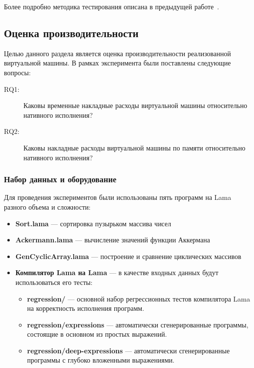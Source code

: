 Более подробно методика тестирования описана в предыдущей работе~\cite{ParfenovPractice2026}. 
\subsection{Оценка производительности}

Целью данного раздела является оценка производительности реализованной виртуальной машины. В рамках эксперимента были поставлены следующие вопросы:
\begin{description}
  \item[RQ1:] Каковы временные накладные расходы виртуальной машины относительно нативного исполнения?
  \item[RQ2:] Каковы накладные расходы виртуальной машины по памяти относительно нативного исполнения?
\end{description}

\subsubsection{Набор данных и оборудование}
Для проведения экспериментов были использованы пять программ на Lama разного объема и сложности:
\begin{itemize}
  \item \textbf{Sort.lama} --- сортировка пузырьком массива чисел
  \item \textbf{Ackermann.lama} --- вычисление значений функции Аккермана
  \item \textbf{GenCyclicArray.lama} --- построение и сравнение циклических массивов
  \item \textbf{Компилятор Lama на Lama} --- в качестве входных данных будут использоваться его тесты:
    \begin{itemize}
      \item \textbf{regression/} --- основной набор регрессионных тестов компилятора Lama на корректность исполнения программ. 
      \item \textbf{regression/expressions} --- автоматически сгенерированные программы, состоящие в основном из простых выражений.
    \item \textbf{regression/deep-expressions} --- автоматически сгенерированные программы с глубоко вложенными выражениями.

    \end{itemize}
\end{itemize}


